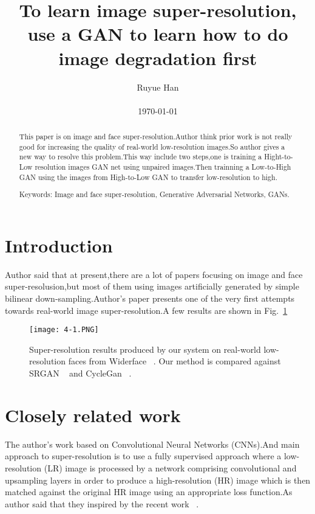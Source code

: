 \documentclass[10pt,twocolumn,letterpaper]{article}
\begin{document}
\title{To learn image super-resolution, use a GAN to
learn how to do image degradation first}

\author{Ruyue Han\\\\ \today}

\maketitle

\begin{abstract}
   This paper is on image and face super-resolution.Author think prior work is not really good for increasing the quality of real-world low-resolution images.So author gives a new way to resolve this problem.This way include two steps,one is training a Hight-to-Low resolution images GAN net using unpaired images.Then trainning a Low-to-High GAN using the images from High-to-Low GAN to transfer low-resolution to high.
   
   Keywords: Image and face super-resolution, Generative Adversarial
Networks, GANs.

\end{abstract}
\section{Introduction}
	Author said that at present,there are a lot of papers focusing on image and face super-resolusion,but most of them using images artificially generated by simple bilinear down-sampling.Author's paper presents one of the very first attempts towards real-world image super-resolution.A few results are shown in Fig.~\ref{fig:resolution}
\begin{figure}[htb]
\centering
\texttt{[image: 4-1.PNG]}
\caption{Super-resolution results produced by our system on real-world low-
resolution faces from Widerface ~\cite{Wider2016_1}. Our method is compared against SRGAN ~\cite{Photo2017_2} and CycleGan ~\cite{Unpaired2017_3}.}
\label{fig:resolution}
\end{figure}

\section{Closely related work}
The author's work based on Convolutional Neural Networks (CNNs).And main approach to super-resolution is to use a fully supervised approach where a low-resolution (LR) image is processed by a network comprising convolutional and upsampling layers in order to produce a high-resolution (HR) image which is then matched against the original HR image using an appropriate loss function.As author said that they inspired by the recent work ~\cite{Super2017_4}.
\end{document}

